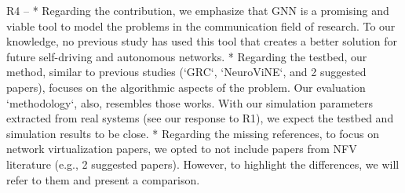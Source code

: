 R4
--
* Regarding the contribution, we emphasize that GNN is a promising and viable tool to model the problems in the communication field of research. To our knowledge, no previous study has used this tool that creates a better solution for future self-driving and autonomous networks.
* Regarding the testbed, our method, similar to previous studies (`GRC`, `NeuroViNE`, and 2 suggested papers), focuses on the algorithmic aspects of the problem. Our evaluation `methodology`, also, resembles those works. With our simulation parameters extracted from real systems (see our response to R1), we expect the testbed and simulation results to be close. 
* Regarding the missing references, to focus on network virtualization papers, we opted to not include papers from NFV literature (e.g., 2 suggested papers). However, to highlight the differences, we will refer to them and present a comparison.